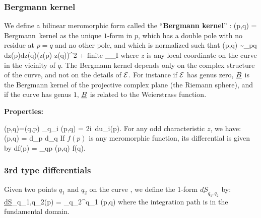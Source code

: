 \subsubsection{Bergmann kernel}\label{secdefBergmann}

We define a bilinear meromorphic form called the ``{\bf Bergmann kernel}'' \cite{BergSchif, Fay2}:
\beq
\Bergmann(p,q) = \hbox{Bergmann kernel}
\eeq
as the unique $1$-form in $p$, which has a double pole with no residue at $p=q$ and no other pole, and which is normalized such that
\beq
\Bergmann(p,q) \sim_{p\to q} {dz(p)dz(q)\over (z(p)-z(q))^2} + {\rm finite}
\virg
\oint_{\underline\acycle_I} 
\eeq
where $z$ is any local coordinate on the curve in the vicinity of $q$.
The Bergmann kernel depends only on the complex structure of the curve, and not on the details of ${\cal E}$.
For instance if ${\cal E}$ has genus zero, ${\underline{B}}$ is the Bergmann kernel of the projective complex plane (the Riemann sphere),
and if the curve has genus $1$, ${\underline{B}}$ is related to the Weierstrass function.



\medskip

{\bf Properties:}

\beq
\Bergmann(p,q)=\Bergmann(q,p)
\virg
\oint_{q\in\underline\bcycle_i} \Bergmann(p,q) = 2i\pi\, du_i(p).
\eeq
%
For any odd characteristic $z$, we have:
\beq
\Bergmann(p,q) = d_p d_q 
\eeq
%
If $f(p)$ is any meromorphic function, its differential is given by
\beq\label{Bergmanndiff}
df(p) = \Res_{q\to p} \Bergmann(p,q) f(q).
\eeq

\subsubsection{3rd type differentials}

Given two points $q_1$ and $q_2$ on the curve , we define the 1-form $\underline{dS}_{q_1,q_2}$ by:
\beq
\underline{dS}_{q_1,q_2}(p) = \int_{q_2}^{q_1} \Bergmann(p,q)
\eeq
where the integration path is in the fundamental domain.

